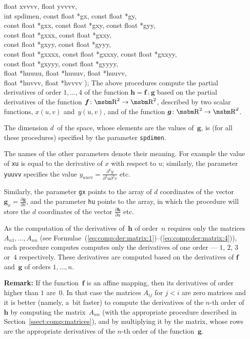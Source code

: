 {float xvvvv, float yvvvv, \\
int spdimen, const float *gx, const float *gy, \\
const float *gxx, const float *gxy, const float *gyy, \\
const float *gxxx, const float *gxxy, \\
const float *gxyy, const float *gyyy, \\
const float *gxxxx, const float *gxxxy, const float *gxxyy, \\
const float *gxyyy, const float *gyyyy, \\
float *huuuu, float *huuuv, float *huuvv, \\
float *huvvv, float *hvvvv );}
\hspace*{\parindent}
The above procedures compute the partial derivatives of order $1,\ldots,4$
of the function $\bm{h}=\bm{f}\comp\bm{g}$ based on the partial derivatives
of the function $\bm{f}\colon\R^2\rightarrow\R^2$, described by two scalar
functions, $x(u,v)$ and~$y(u,v)$, and of the function
$\bm{g}\colon\R^2\rightarrow\R^d$.

The dimension $d$~of the space, whose elements are the values of~$\bm{g}$,
is (for all these procedures) specified by the parameter \texttt{spdimen}.

The names of the other parameters denote their meaning.
For example the value of \texttt{xu} is equal to the derivative of
$x$ with respect to $u$; similarly, the parameter \texttt{yuuvv} specifies
the value $y_{uuvv}=\frac{\partial^4 y}{\partial^2u\partial^2v}$ etc.

Similarly, the parameter \texttt{gx} points to the array of $d$ coordinates
of the vector $\bm{g}_x=\frac{\partial\bm{g}}{\partial x}$, and the parameter
\texttt{hu} points to the array, in which the procedure will store the
$d$ coordinates of the vector $\frac{\partial\bm{h}}{\partial u}$ etc.

As the computation of the derivatives of~$\bm{h}$ of order~$n$ requires
only the matrices $A_{n1},\ldots,A_{nn}$ (see
Formulae~(\ref{eq:comp:der:matrix:1})--(\ref{eq:comp:der:matrix:4})),
each procedure computes computes only the derivatives of
one order --- $1$, $2$, $3$ or~$4$ respectively. 
These derivatives are computed based on the derivatives of $\bm{f}$
and~$\bm{g}$ of orders $1,\ldots,n$.

\vspace{\medskipamount}
\noindent
\textbf{Remark:} If the function~$\bm{f}$ is an affine mapping, then
its derivatives of order higher than $1$ are~$0$. In that case the matrices
$A_{ij}$ for $j<i$ are zero matrices and it is better (namely, a~bit faster)
to compute the derivatives of the $n$-th order of~$\bm{h}$ by computing
the matrix~$A_{nn}$ (with the appropriate procedure described in
Section~\ref{ssect:comp:matrices}), and by multiplying it by the
matrix, whose rows are the appropriate derivatives of the $n$-th order
of the function~$\bm{g}$.



